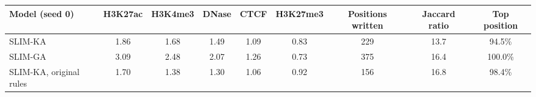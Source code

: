 \begin{tabular}{lcccccccc}
\toprule
Model (seed 0) & H3K27ac & H3K4me3 & DNase & CTCF & H3K27me3 & Positions written & Jaccard ratio & Top position \\
\midrule
SLIM-KA & 1.86 & 1.68 & 1.49 & 1.09 & 0.83 & 229 & 13.7 & 94.5\% \\
SLIM-GA & 3.09 & 2.48 & 2.07 & 1.26 & 0.73 & 375 & 16.4 & 100.0\% \\
SLIM-KA, original rules & 1.70 & 1.38 & 1.30 & 1.06 & 0.92 & 156 & 16.8 & 98.4\% \\
\bottomrule
\end{tabular}
